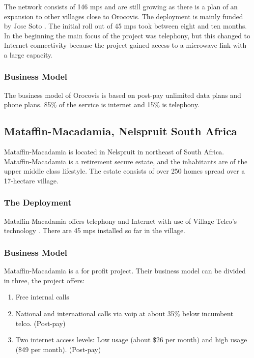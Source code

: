 The network consists of 146 \glspl{mp} and are still growing as there is a plan of an expansion to other villages close to Orocovis. The deployment is mainly funded by Jose Soto \cite{vtpuertorico}. The initial roll out of 45 \glspl{mp} took between eight and ten months. In the beginning the main focus of the project was telephony, but this changed to Internet connectivity because the project gained access to a microwave link with a large capacity. 

\subsubsection{Business Model}
The business model of Orocovis is based on post-pay unlimited data plans and phone plans. 85\% of the service is internet and 15\% is telephony. 

\subsection{Mataffin-Macadamia, Nelspruit South Africa}
Mataffin-Macadamia is located in Nelspruit in northeast of South Africa. Mataffin-Macadamia is a retirement secure estate, and the inhabitants are of the upper middle class lifestyle. The estate consists of over 250 homes spread over a 17-hectare village. 

\subsubsection{The Deployment}
Mataffin-Macadamia offers telephony and Internet with use of Village Telco's technology \cite{mataffinict}. There are 45 \glspl{mp} installed so far in the village.

\subsubsection{Business Model}
Mataffin-Macadamia is a for profit project. Their business model can be divided in three, the project offers: 
\begin{enumerate}
\item Free internal calls
\item National and international calls via \gls{voip} at about 35\% below incumbent telco. (Post-pay)
\item Two internet access levels: Low usage (about \$26 per month) and high usage (\$49 per month). (Post-pay)
\end{enumerate}

